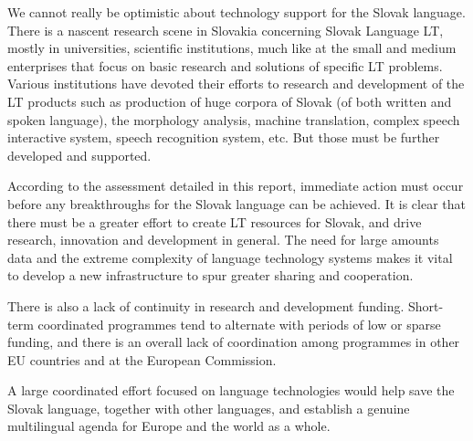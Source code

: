 \begin{multicols}{2}
We cannot really be optimistic about technology support for the Slovak
language. There is a nascent research scene in Slovakia concerning Slovak
Language LT, mostly in universities, scientific institutions, much like at the
small and medium enterprises that focus on basic research and solutions of
specific LT problems. Various institutions have devoted their efforts to
research and development of the LT products such as production of huge corpora of Slovak (of both written and spoken language), the morphology analysis, machine translation, complex speech interactive system, speech recognition system, etc. But those must be further developed and supported. 

According to the assessment detailed in this report, immediate action must
occur before any breakthroughs for the Slovak language can be achieved. It is
clear that there must be a greater effort to create LT resources for Slovak,
and drive research, innovation and development in general. The need for large
amounts data and the extreme complexity of language technology systems makes it
vital to develop a new infrastructure to spur greater sharing and cooperation.

There is also a lack of continuity in research and development funding. Short-term coordinated programmes tend to alternate with periods of low or sparse funding, and there is an overall lack of coordination among programmes in other EU countries and at the European Commission.

A large coordinated effort focused on language technologies would help
save the Slovak language, together with other languages, and establish a
genuine multilingual agenda for Europe and the world as a
whole\cite{f32}.

\end{multicols}

\clearpage



